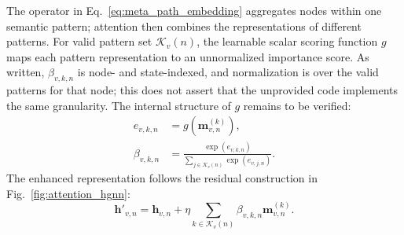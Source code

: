 

The operator in Eq.~\eqref{eq:meta_path_embedding} aggregates nodes within one semantic pattern;
attention then combines the representations of different patterns. For valid pattern set
$\mathcal K_v(n)$, the learnable scalar scoring function $g$ maps each pattern representation
to an unnormalized importance score. As written, $\beta_{v,k,n}$ is node- and state-indexed,
and normalization is over the valid patterns for that node; this does not assert that the unprovided
code implements the same granularity. The internal structure of $g$ remains to be verified:
\begin{equation}
 \begin{aligned}
 e_{v,k,n}&=g(\boldsymbol{m}^{(k)}_{v,n}), \\
 \beta_{v,k,n}&=\frac{\exp(e_{v,k,n})}
 {\sum_{j\in\mathcal K_v(n)}\exp(e_{v,j,n})}.
 \end{aligned}
 \label{eq:relation_semantic_attention}
\end{equation}
The enhanced representation follows the residual construction in Fig.~\ref{fig:attention_hgnn}:
\begin{equation}
 \boldsymbol{h}'_{v,n}=\boldsymbol{h}_{v,n}
 +\eta\sum_{k\in\mathcal K_v(n)}\beta_{v,k,n}\boldsymbol{m}^{(k)}_{v,n}.
 \label{eq:hgnn_update}
\end{equation}
